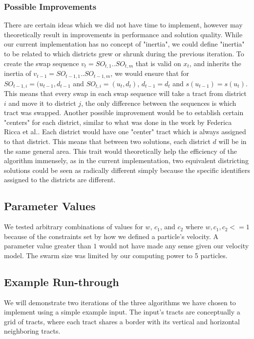 \documentclass[journal]{IEEEtran}
\begin{document}
\subsubsection{Possible Improvements}
There are certain ideas which we did not have time to implement, however may
theoretically result in improvements in performance and solution quality.  While
our current implementation has no concept of "inertia", we could define
"inertia" to be related to which districts grew or shrunk during the previous
iteration.  To create the swap sequence $v_{t} = SO_{t, 1} .. SO_{t, m}$ that is
valid on $x_t$, and inherits the inertia of $v_{t - 1} = SO_{t - 1, 1} .. SO_{t
- 1, m}$, we would ensure that for $SO_{t - 1, i} = (u_{t - 1}, d_{t - 1}$ and
$SO_{t, i} = (u_t, d_t)$, $d_{t - 1} = d_t$ and $s(u_{t - 1}) = s(u_t)$.  This
means that every swap in each swap sequence will take a tract from district $i$
and move it to district $j$, the only difference between the sequences is which
tract was swapped.  Another possible improvement would be to establish certain
"centers" for each district, similar to what was done in the work by Federica
Ricca et al.\cite{voronoi}.  Each district would have one "center" tract which
is always assigned to that district.  This means that between two solutions,
each district $d$ will be in the same general area.  This trait would
theoretically help the efficiency of the algorithm immensely, as in the current
implementation, two equivalent districting solutions could be seen as radically
different simply because the specific identifiers assigned to the districts are
different.  


\subsection{Parameter Values}
We tested arbitrary combinations of values for $w$, $c_1$, and $c_2$ where $w, c_1, c_2 <= 1$ because of the constraints set by how we defined a particle's velocity. A parameter value greater than $1$ would not have made any sense given our velocity model. The swarm size was limited by our computing power to 5 particles.

\subsection{Example Run-through}
We will demonstrate two iterations of the three algorithms we have chosen to implement using a simple example input.
The input's tracts are conceptually a grid of tracts, where each tract shares a border with its vertical and horizontal neighboring tracts.
\end{document}
